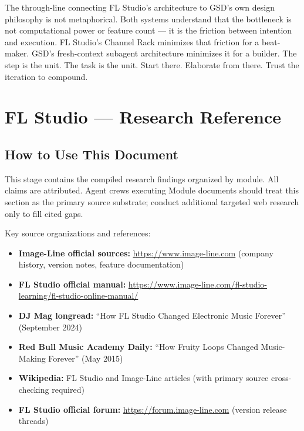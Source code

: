 \documentclass[11pt,letterpaper]{article}
\newcommand{\stageheader}[2]{%
  \noindent\colorbox{#2}{\makebox[\textwidth][l]{%
    \textcolor{white}{\bfseries\sffamily\hspace{6pt}#1\hspace{6pt}}}}%
  \vspace{0.5em}\par%
}
\begin{document}
The through-line connecting FL Studio's architecture to GSD's own design philosophy is not metaphorical. Both systems understand that the bottleneck is not computational power or feature count --- it is the friction between intention and execution. FL Studio's Channel Rack minimizes that friction for a beat-maker. GSD's fresh-context subagent architecture minimizes it for a builder. The step is the unit. The task is the unit. Start there. Elaborate from there. Trust the iteration to compound.


\newpage
\stageheader{STAGE 2 --- RESEARCH REFERENCE}{secondary}

\section{FL Studio --- Research Reference}

\subsection{How to Use This Document}

This stage contains the compiled research findings organized by module. All claims are attributed. Agent crews executing Module documents should treat this section as the primary source substrate; conduct additional targeted web research only to fill cited gaps.

Key source organizations and references:
\begin{itemize}[noitemsep]
  \item \textbf{Image-Line official sources:} \url{https://www.image-line.com} (company history, version notes, feature documentation)
  \item \textbf{FL Studio official manual:} \url{https://www.image-line.com/fl-studio-learning/fl-studio-online-manual/}
  \item \textbf{DJ Mag longread:} ``How FL Studio Changed Electronic Music Forever'' (September 2024)
  \item \textbf{Red Bull Music Academy Daily:} ``How Fruity Loops Changed Music-Making Forever'' (May 2015)
  \item \textbf{Wikipedia:} FL Studio and Image-Line articles (with primary source cross-checking required)
  \item \textbf{FL Studio official forum:} \url{https://forum.image-line.com} (version release threads)
\end{itemize}
\end{document}
